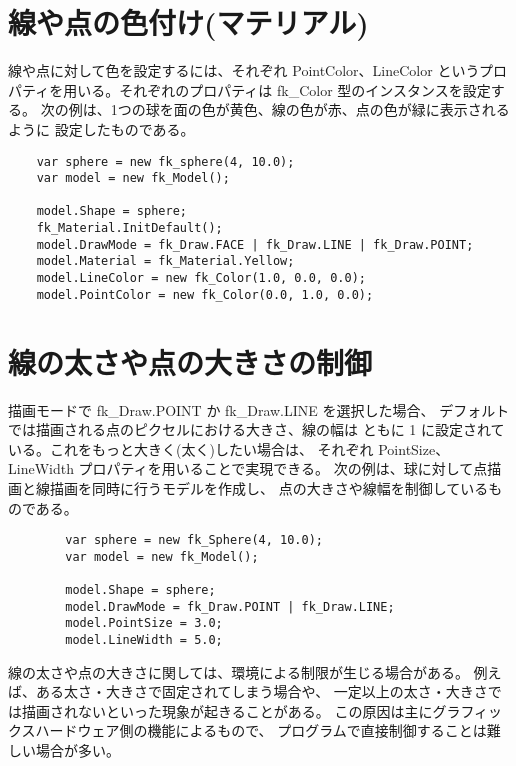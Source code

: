 \section{線や点の色付け(マテリアル)} \label{sec:pointlinemat}
線や点に対して色を設定するには、それぞれ PointColor、LineColor
というプロパティを用いる。それぞれのプロパティは fk\_Color 型のインスタンスを設定する。
次の例は、1つの球を面の色が黄色、線の色が赤、点の色が緑に表示されるように
設定したものである。
\\
\begin{breakbox}
\begin{verbatim}
    var sphere = new fk_sphere(4, 10.0);
    var model = new fk_Model();
    
    model.Shape = sphere;
    fk_Material.InitDefault();
    model.DrawMode = fk_Draw.FACE | fk_Draw.LINE | fk_Draw.POINT;
    model.Material = fk_Material.Yellow;
    model.LineColor = new fk_Color(1.0, 0.0, 0.0);
    model.PointColor = new fk_Color(0.0, 1.0, 0.0);
\end{verbatim}
\end{breakbox}

\section{線の太さや点の大きさの制御} \label{sec:widthsize}
描画モードで fk\_Draw.POINT か fk\_Draw.LINE を選択した場合、
デフォルトでは描画される点のピクセルにおける大きさ、線の幅は
ともに 1 に設定されている。これをもっと大きく(太く)したい場合は、
それぞれ PointSize、LineWidth プロパティを用いることで実現できる。
次の例は、球に対して点描画と線描画を同時に行うモデルを作成し、
点の大きさや線幅を制御しているものである。
\\
\begin{breakbox}
\begin{verbatim}
        var sphere = new fk_Sphere(4, 10.0);
        var model = new fk_Model();

        model.Shape = sphere;
        model.DrawMode = fk_Draw.POINT | fk_Draw.LINE;
        model.PointSize = 3.0;
        model.LineWidth = 5.0;
\end{verbatim}
\end{breakbox}

線の太さや点の大きさに関しては、環境による制限が生じる場合がある。
例えば、ある太さ・大きさで固定されてしまう場合や、
一定以上の太さ・大きさでは描画されないといった現象が起きることがある。
この原因は主にグラフィックスハードウェア側の機能によるもので、
プログラムで直接制御することは難しい場合が多い。

